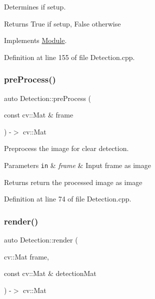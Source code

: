 Determines if setup. 

\begin{DoxyReturn}{Returns}
True if setup, False otherwise 
\end{DoxyReturn}


Implements \hyperlink{class_module_a20fb30b0bf6ea415e93efbbacc68043c}{Module}.



Definition at line 155 of file Detection.\+cpp.

\mbox{\label{class_detection_a898f16ebdea8c1c3cc2cd789a9bfadc9}} 
\subsubsection{\texorpdfstring{pre\+Process()}{preProcess()}}
{\footnotesize\ttfamily auto Detection\+::pre\+Process (\begin{DoxyParamCaption}\item[{const cv\+::\+Mat \&}]{frame }\end{DoxyParamCaption}) -\/$>$ cv\+::\+Mat}



Preprocess the image for clear detection. 


\begin{DoxyParams}[1]{Parameters}
\mbox{\tt in}  & {\em frame} & Input frame as image\\
\hline
\end{DoxyParams}
\begin{DoxyReturn}{Returns}
return the processed image as image 
\end{DoxyReturn}


Definition at line 74 of file Detection.\+cpp.

\mbox{\label{class_detection_a1a481a0248acb74cb0df6bcd437783eb}} 
\subsubsection{\texorpdfstring{render()}{render()}}
{\footnotesize\ttfamily auto Detection\+::render (\begin{DoxyParamCaption}\item[{cv\+::\+Mat}]{frame,  }\item[{const cv\+::\+Mat \&}]{detection\+Mat }\end{DoxyParamCaption}) -\/$>$ cv\+::\+Mat}




